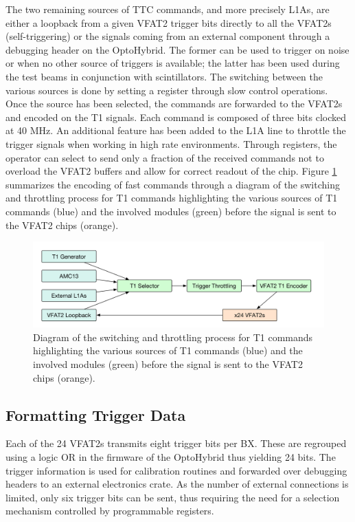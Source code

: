       The two remaining sources of TTC commands, and more precisely L1As, are either a loopback from a given VFAT2 trigger bits directly to all the VFAT2s (self-triggering) or the signals coming from an external component through a debugging header on the OptoHybrid. The former can be used to trigger on noise or when no other source of triggers is available; the latter has been used during the test beams in conjunction with scintillators. The switching between the various sources is done by setting a register through slow control operations. Once the source has been selected, the commands are forwarded to the VFAT2s and encoded on the T1 signals. Each command is composed of three bits clocked at 40 MHz. An additional feature has been added to the L1A line to throttle the trigger signals when working in high rate environments. Through registers, the operator can select to send only a fraction of the received commands not to overload the VFAT2 buffers and allow for correct readout of the chip. Figure \ref{fig:II-3-t1-switch} summarizes the encoding of fast commands through a diagram of the switching and throttling process for T1 commands highlighting the various sources of T1 commands (blue) and the involved modules (green) before the signal is sent to the VFAT2 chips (orange).

      \begin{figure}[h!]
        \centering
        \includegraphics[width=\textwidth]{img/II-3-test-beam/t1-switch}
        \caption{Diagram of the switching and throttling process for T1 commands highlighting the various sources of T1 commands (blue) and the involved modules (green) before the signal is sent to the VFAT2 chips (orange).}
        \label{fig:II-3-t1-switch}
      \end{figure}

    \subsection{Formatting Trigger Data}

      Each of the 24 VFAT2s transmits eight trigger bits per BX. These are regrouped using a logic OR in the firmware of the OptoHybrid thus yielding 24 bits. The trigger information is used for calibration routines and forwarded over debugging headers to an external electronics crate. As the number of external connections is limited, only six trigger bits can be sent, thus requiring the need for a selection mechanism controlled by programmable registers.

